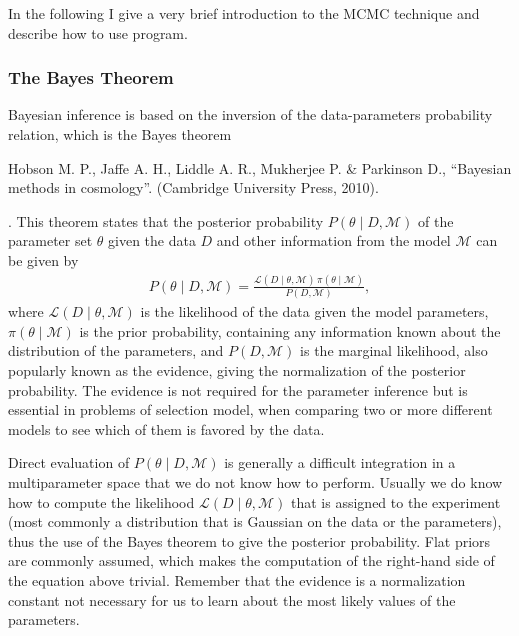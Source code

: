 \documentclass[letterpaper,12pt,english]{sphinxhowto}
\begin{document}
In the following I give a very brief introduction to the MCMC technique and
describe how to use program.


\subsubsection{The Bayes Theorem}
\label{\detokenize{intro:the-bayes-theorem}}
Bayesian inference is based on the inversion of the data-parameters probability
relation, which is the Bayes theorem %
\begin{footnote}[1]\sphinxAtStartFootnote
Hobson M. P., Jaffe A. H., Liddle A. R., Mukherjee P. \& Parkinson D., “Bayesian methods in cosmology”. (Cambridge University Press, 2010).
%
\end{footnote}.
This theorem states that the posterior
probability \(P(\theta \mid D, \mathcal{M})\) of the parameter set
\(\theta\) given the data \(D\) and other information from the model
\(\mathcal{M}\) can be given by
\begin{equation*}
\begin{split}P(\theta \mid D, \mathcal{M}) = \frac{\mathcal{L}(D \mid \theta, \mathcal{M}) \, \pi(\theta \mid \mathcal{M})}{P(D, \mathcal{M})},\end{split}
\end{equation*}
where \(\mathcal{L}(D \mid \theta, \mathcal{M})\) is the likelihood of the
data given the model parameters, \(\pi(\theta \mid \mathcal{M})\) is the
prior probability, containing any information known  about the
distribution of the parameters, and \(P(D, \mathcal{M})\) is the marginal
likelihood, also popularly known as the evidence, giving the normalization of
the posterior probability. The evidence is not required for the parameter
inference but is essential in problems of selection model, when comparing two
or more different models to see which of them is favored by the data.

Direct evaluation of \(P(\theta \mid D, \mathcal{M})\) is generally a
difficult integration in a multiparameter space that we do not know how to
perform. Usually we do know how to compute the likelihood
\(\mathcal{L}(D \mid \theta, \mathcal{M})\) that is assigned to the
experiment (most commonly a distribution that is Gaussian on the data or the
parameters),
thus the use of the Bayes theorem to give the posterior probability.
Flat priors are commonly assumed, which makes the computation of the right-hand
side of the equation above trivial.
Remember that the evidence is a normalization constant not necessary for us to
learn about the most likely values of the parameters.
\end{document}
